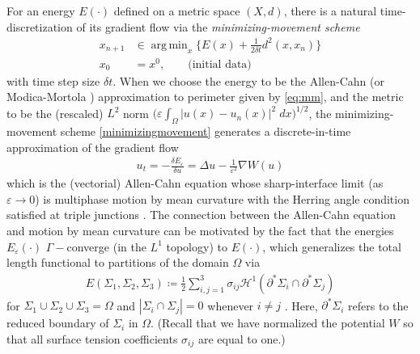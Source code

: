 \documentclass{article}
\theoremstyle{plain}
\theoremstyle{definition}
\theoremstyle{remark}
\newcommand{\eps}{\varepsilon}
\DeclareMathOperator*{\argmin}{arg\,min}
\begin{document}
For an energy $E(\cdot)$ defined on a metric space $(X,d)$, there is a natural time-discretization of its gradient flow via the \textit{minimizing-movement scheme} \cite{degiorgi}
\begin{equation}\label{minimizingmovement}
\begin{split}
    x_{n+1} &\in \argmin_{x} \bigg\{E(x) + \frac{1}{2\delta t}d^2(x,x_n) \bigg\}\\
    x_0 &= x^0, \qquad \text{(initial data)}
\end{split}
\end{equation}
with time step size $\delta t$. When we choose the energy to be the Allen-Cahn (or Modica-Mortola \cite{modica_mortola}) approximation to perimeter given by \eqref{eq:mm}, 
 and the metric to be the (rescaled) $L^2$ norm $\big(\eps\int_{\Omega}|u(x)-u_n(x)|^2\;dx\big)^{1/2}$, the minimizing-movement scheme \eqref{minimizingmovement} generates a discrete-in-time approximation of the gradient flow
\begin{align}\label{allencahn}
    u_t = -\frac{\delta E_\eps}{\delta u} = \Delta u - \frac{1}{\eps^2}\nabla W(u)
\end{align}
which is the (vectorial) Allen-Cahn equation \cite{allencahn} whose sharp-interface limit (as $\eps\to 0$) is multiphase motion by mean curvature with the Herring angle condition satisfied at triple junctions \cite{bronsardreitich,lauxsimon}. The connection between the Allen-Cahn equation and motion by mean curvature can be motivated by the fact that the energies $E_\eps(\cdot)$ $\Gamma-$converge (in the $L^1$ topology) to $E(\cdot)$, which generalizes the total length functional to partitions of the domain $\Omega$ via
\begin{align}
    E(\Sigma_1,\Sigma_2,\Sigma_3) \coloneqq \frac{1}{2}\sum_{i,j=1}^3\sigma_{ij}\mathcal{H}^1(\partial^* \Sigma_i \cap \partial^* \Sigma_j)
\end{align}
for $\Sigma_1\cup\Sigma_2\cup\Sigma_3 = \Omega$ and $|\Sigma_i\cap\Sigma_j| = 0$ whenever $i\neq j$ \cite{BALDO199067}. Here, $\partial^*\Sigma_i$ refers to the reduced boundary of $\Sigma_i$ in $\Omega$. (Recall that we have normalized the potential $W$ so that all surface tension coefficients $\sigma_{ij}$ are equal to one.)
\end{document}
